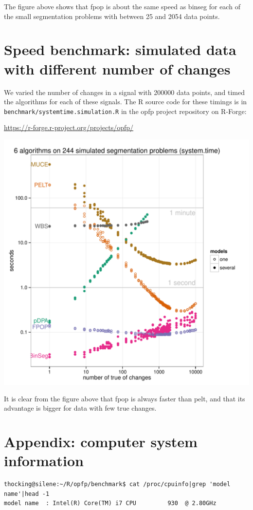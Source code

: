 \documentclass{article}
\begin{document}
The figure above shows that fpop is about the same speed as binseg for
each of the small segmentation problems with between 25 and 2054 data
points.


\newpage

\section{Speed benchmark: simulated data with different 
  number of changes}

We varied the number of changes in a signal with 200000 data points,
and timed the algorithms for each of these signals. The R source code
for these timings is in \verb|benchmark/systemtime.simulation.R| in
the opfp project repository on R-Forge:

\url{https://r-forge.r-project.org/projects/opfp/}

\begin{center}
  \includegraphics[width=\textwidth]{figure-systemtime-simulation}
\end{center}

It is clear from the figure above that fpop is always faster than
pelt, and that its advantage is bigger for data with few true changes.

\newpage

\section{Appendix: computer system information}

\begin{verbatim}
thocking@silene:~/R/opfp/benchmark$ cat /proc/cpuinfo|grep 'model name'|head -1
model name	: Intel(R) Core(TM) i7 CPU         930  @ 2.80GHz
\end{verbatim}



\end{document}
